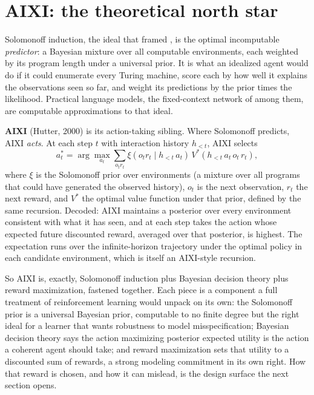 
\section{AIXI: the theoretical north star}\label{sec:aixi}

Solomonoff induction, the ideal that framed , is the
optimal incomputable \emph{predictor}: a Bayesian mixture over all computable
environments, each weighted by its program length under a universal prior. It
is what an idealized agent would do if it could enumerate every Turing
machine, score each by how well it explains the observations seen so far, and
weight its predictions by the prior times the likelihood. Practical language
models, the fixed-context network of  among them, are
computable approximations to that ideal.

\textbf{AIXI} (Hutter, 2000) is its action-taking sibling. Where Solomonoff
predicts, AIXI \emph{acts}. At each step $t$ with interaction history
$h_{<t}$, AIXI selects
\[
  a_t^{*} = \arg\max_{a_t} \sum_{o_t r_t}
            \xi(o_t r_t \mid h_{<t}\, a_t)\,
            V^{*}(h_{<t}\, a_t\, o_t\, r_t),
\]
where $\xi$ is the Solomonoff prior over environments (a mixture over all
programs that could have generated the observed history), $o_t$ is the next
observation, $r_t$ the next reward, and $V^{*}$ the optimal value function
under that prior, defined by the same recursion. Decoded: AIXI maintains a
posterior over every environment consistent with what it has seen, and at each
step takes the action whose expected future discounted reward, averaged over
that posterior, is highest. The expectation runs over the infinite-horizon
trajectory under the optimal policy in each candidate environment, which is
itself an AIXI-style recursion.

So AIXI is, exactly, Solomonoff induction plus Bayesian decision theory plus
reward maximization, fastened together. Each piece is a component a full
treatment of reinforcement learning would unpack on its own: the Solomonoff
prior is a universal Bayesian prior, computable to no finite degree but the
right ideal for a learner that wants robustness to model misspecification;
Bayesian decision theory says the action maximizing posterior expected utility
is the action a coherent agent should take; and reward maximization sets that
utility to a discounted sum of rewards, a strong modeling commitment in its own
right. How that reward is chosen, and how it can mislead, is the design surface
the next section opens.


